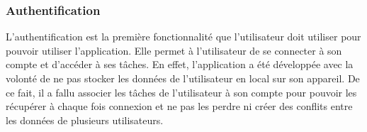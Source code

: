\documentclass[12pt]{article}
\begin{document}
        \subsubsection{Authentification}\label{subsubsec:authentification}
        L'authentification est la première fonctionnalité que l'utilisateur doit utiliser pour pouvoir utiliser l'application.
        Elle permet à l'utilisateur de se connecter à son compte et d'accéder à ses tâches.
        En effet, l'application a été développée avec la volonté de ne pas stocker les données de l'utilisateur en local sur son appareil.
        De ce fait, il a fallu associer les tâches de l'utilisateur à son compte pour pouvoir les récupérer à chaque
        fois connexion et ne pas les perdre ni créer des conflits entre les données de plusieurs utilisateurs.\\
\end{document}

